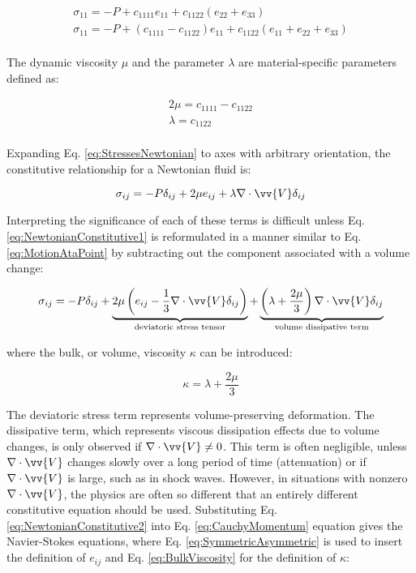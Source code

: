 \documentclass[10pt]{article}
\numberwithin{equation}{section} %
\begin{document}
\begin{equation}
\label{eq:StressesNewtonian}
\begin{aligned}
\sigma_{11}=-P+c_{1111}e_{11}+c_{1122}(e_{22}+e_{33})\\
\sigma_{11}=-P+(c_{1111}-c_{1122})e_{11}+c_{1122}(e_{11}+e_{22}+e_{33})\\
\end{aligned}
\end{equation}

The dynamic viscosity \(\mu\) and the parameter \(\lambda\) are material-specific parameters defined as:

\begin{equation}
\begin{aligned}
\label{eq:Lame}
2\mu=c_{1111}-c_{1122}\\
\lambda=c_{1122}\\
\end{aligned}
\end{equation}

Expanding Eq. \eqref{eq:StressesNewtonian} to axes with arbitrary orientation, the constitutive relationship for a Newtonian fluid is:

\begin{equation}
\label{eq:NewtonianConstitutive1}
\sigma_{ij}=-P\delta_{ij}+2\mu e_{ij}+\lambda\nabla\cdot\vv{V}\delta_{ij}
\end{equation}

Interpreting the significance of each of these terms is difficult unless Eq. \eqref{eq:NewtonianConstitutive1} is reformulated in a manner similar to Eq. \eqref{eq:MotionAtaPoint} by subtracting out the component associated with a volume change:

\begin{equation}
\label{eq:NewtonianConstitutive2}
\sigma_{ij}=-P\delta_{ij}+\underbrace{2\mu\left(e_{ij}-\frac{1}{3}\nabla\cdot\vv{V}\delta_{ij}\right)}_\text{deviatoric stress tensor}+\underbrace{\left(\lambda+\frac{2\mu}{3}\right)\nabla\cdot\vv{V}\delta_{ij}}_\text{volume dissipative term}
\end{equation}

where the bulk, or volume, viscosity \(\kappa\) can be introduced:

\begin{equation}
\label{eq:BulkViscosity}
\kappa=\lambda+\frac{2\mu}{3}
\end{equation}

The deviatoric stress term represents volume-preserving deformation. The dissipative term, which represents viscous dissipation effects due to volume changes, is only observed if \(\nabla\cdot\vv{V}\neq 0\). This term is often negligible, unless \(\nabla\cdot\vv{V}\) changes slowly over a long period of time (attenuation) or if \(\nabla\cdot\vv{V}\) is large, such as in shock waves. However, in situations with nonzero \(\nabla\cdot\vv{V}\), the physics are often so different that an entirely different constitutive equation should be used. Substituting Eq. \eqref{eq:NewtonianConstitutive2} into Eq. \eqref{eq:CauchyMomentum} equation gives the Navier-Stokes equations, where Eq. \eqref{eq:SymmetricAsymmetric} is used to insert the definition of \(e_{ij}\) and Eq. \eqref{eq:BulkViscosity} for the definition of \(\kappa\):
\end{document}
